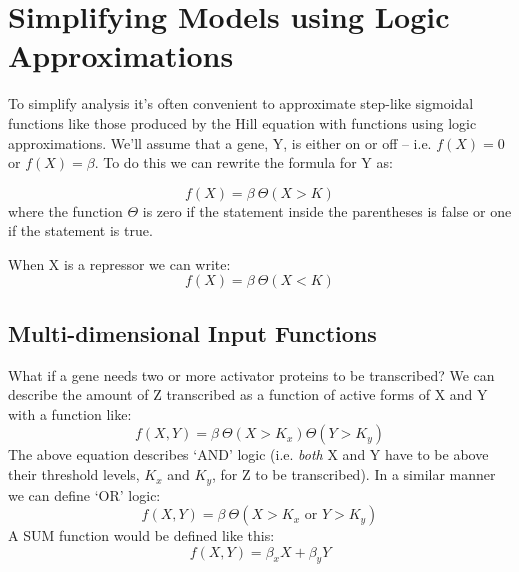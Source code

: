\documentclass[11pt,letterpaper,oneside,pagesize]{scrartcl}
\begin{document}




\section{Simplifying Models using Logic Approximations}

To simplify analysis it's often convenient to approximate step-like sigmoidal functions like those produced by the Hill equation with functions using logic approximations. We'll assume that a gene, Y, is either on or off -- i.e. $f(X) = 0$ or $f(X) = \beta$. To do this we can rewrite the formula for Y as:

\[
f(X) = \beta\ \Theta(X > K)
\]
where the function $\Theta$ is zero if the statement inside the parentheses is false or one if the statement is true.

When X is a repressor we can write:
\[
f(X) = \beta\ \Theta(X < K)
\]

\subsection{Multi-dimensional Input Functions}

What if a gene needs two or more activator proteins to be transcribed?  We can describe the amount of Z transcribed as a function of active forms of X and Y with a function like:
\[
f(X,Y) = \beta\ \Theta(X > K_x) \Theta(Y > K_y)
\]
The above equation describes `AND' logic (i.e. \emph{both} X and Y have to be above their threshold levels, $K_x$ and $K_y$, for Z to be transcribed). In a similar manner we can define `OR' logic:
\[
f(X,Y) = \beta\ \Theta(X > K_x \mbox{ or } Y > K_y)
\]
A SUM function would be defined like this:
\[
f(X,Y) = \beta_x X + \beta_y Y
\]
\end{document}
